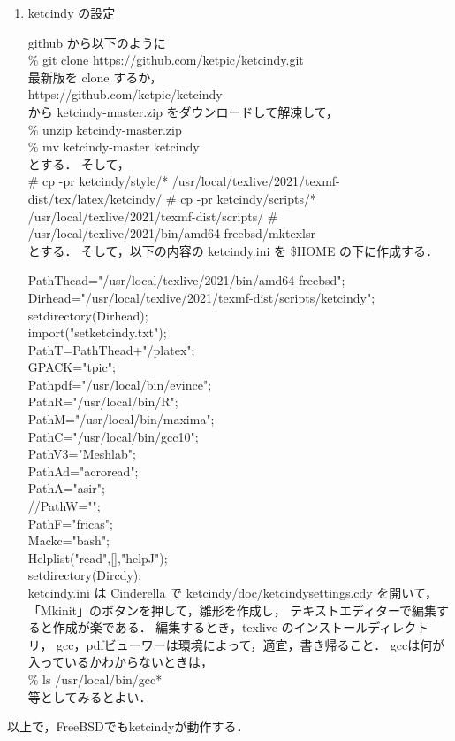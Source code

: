 \documentclass[a4paper,12pt]{jarticle}
\begin{document}
\begin{enumerate}
\item ketcindy の設定

github から以下のように
\\[0.5zw]
\% git clone https://github.com/ketpic/ketcindy.git
\\[0.5zw]
最新版を clone するか，
\\[0.5zw]
https://github.com/ketpic/ketcindy
\\[0.5zw]
から ketcindy-master.zip 
をダウンロードして解凍して，
\\[0.5zw]
\% unzip ketcindy-master.zip
\\
\% mv ketcindy-master ketcindy
\\[0.5zw]
とする．
そして，
\\[0.5zw]
\# cp -pr ketcindy/style/*  /usr/local/texlive/2021/texmf-dist/tex/latex/ketcindy/
\# cp -pr ketcindy/scripts/*  /usr/local/texlive/2021/texmf-dist/scripts/
\# /usr/local/texlive/2021/bin/amd64-freebsd/mktexlsr 
\\[0.5zw]
とする．
そして，以下の内容の ketcindy.ini を \$HOME の下に作成する．

PathThead="/usr/local/texlive/2021/bin/amd64-freebsd";
\\
Dirhead="/usr/local/texlive/2021/texmf-dist/scripts/ketcindy";
\\
setdirectory(Dirhead);
\\
import("setketcindy.txt");
\\
PathT=PathThead+"/platex";
\\
GPACK="tpic";
\\
Pathpdf="/usr/local/bin/evince";
\\
PathR="/usr/local/bin/R";
\\
PathM="/usr/local/bin/maxima";
\\
PathC="/usr/local/bin/gcc10";
\\
PathV3="Meshlab";
\\
PathAd="acroread";
\\
PathA="asir";
\\
//PathW="";
\\
PathF="fricas";
\\
Mackc="bash";
\\
Helplist("read",[],"helpJ");
\\
setdirectory(Dircdy);
\\[1zw]
ketcindy.ini は Cinderella で 
ketcindy/doc/ketcindysettings.cdy 
を開いて，
「Mkinit」のボタンを押して，雛形を作成し，
テキストエディターで編集すると作成が楽である．
編集するとき，texlive のインストールディレクトリ，
gcc，pdfビューワーは環境によって，適宜，書き帰ること．
gccは何が入っているかわからないときは，
\\[0.5zw]
\% ls /usr/local/bin/gcc*
\\[0.5zw]
等としてみるとよい．
\end{enumerate}

以上で，FreeBSDでもketcindyが動作する．
\end{document}
